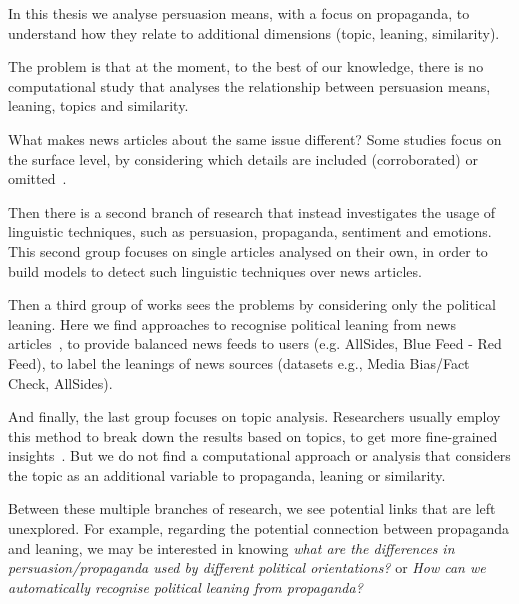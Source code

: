
In this thesis we analyse persuasion means, with a focus on propaganda, to understand how they relate to additional dimensions (topic, leaning, similarity).

The problem is that at the moment, to the best of our knowledge, there is no computational study that analyses the relationship between persuasion means, leaning, topics and similarity.

What makes news articles about the same issue different? 
Some studies focus on the surface level, by considering which details are included (corroborated) or omitted~\citep{bountouridis2018explaining}.

Then there is a second branch of research that instead investigates the usage of linguistic techniques, such as persuasion, propaganda, sentiment and emotions. This second group focuses on single articles analysed on their own, in order to build models to detect such linguistic techniques over news articles. %

Then a third group of works sees the problems by considering only the political leaning. Here we find approaches to recognise political leaning from news articles~\citep{baly2020we}, to provide balanced news feeds to users (e.g. AllSides, Blue Feed - Red Feed), to label the leanings of news sources (datasets e.g., Media Bias/Fact Check, AllSides).

And finally, the last group focuses on topic analysis. Researchers usually employ this method to break down the results based on topics, to get more fine-grained insights~\citep{zhang2023strategic}.
But we do not find a computational approach or analysis that considers the topic as an additional variable to propaganda, leaning or similarity.


Between these multiple branches of research, we see potential links that are left unexplored.
For example, regarding the potential connection between propaganda and leaning, we may be interested in knowing \emph{what are the differences in persuasion/propaganda used by different political orientations?} or \emph{How can we automatically recognise political leaning from propaganda?}

